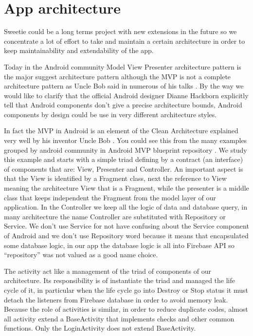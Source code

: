 
\section{App architecture}
\label{sec:app-architecture}

Sweetie could be a long terms project with new extensions in the future so we concentrate a lot of effort to take and maintain a certain architecture in order to keep maintainability and extendability of the app.

Today in the Android community Model View Presenter architecture pattern is the major suggest architecture pattern although the MVP is not a complete architecture pattern as Uncle Bob said in numerous of his talks \cite{Uncle_Bob_MVP}.  By the way we would like to clarify that the official Android designer Dianne Hackborn \cite{Dianne_Hackborn_android_arch} explicitly tell that Android components don't give a precise architecture bounds, Android components by design could be use in very different architecture styles.

In fact the MVP in Android is an element of the Clean Architecture explained very well by his inventor Uncle Bob \cite{Uncle_Bob_CleanArc}. You could see this from the many examples grouped by android community in Android MVP blueprint repository \cite{Android_MVP_blueprints}. We study this example and starts with a simple triad defining by a contract (an interface) of components that are:
View, Presenter and Controller.
An important aspect is that the View is identified by a Fragment class, next the reference to View meaning the architecture View that is a Fragment, while the presenter is a middle class that keeps independent the Fragment from the model layer of our application. In the Controller we keep all the logic of data and database query, in many architecture the name Controller are substituted with Repository or Service. We don't use Service for not have confusing about the Service component of Android and we don't use Repository word because it means that encapsulated some database logic, in our app the database logic is all into Firebase API so ``repository'' was not valued as a good name choice. 

The activity act like a management of the triad of components of our architecture.
Its responsibility is of instantiate the triad and managed the life cycle of it, in particular when the life cycle go into Destroy or Stop status it must detach the listeners from Firebase database in order to avoid memory leak. Because the role of activities is similar, in order to reduce duplicate codes, almost all activity extend a BaseActivity that implements checks and other common functions. Only the LoginActivity does not extend BaseActivity.

